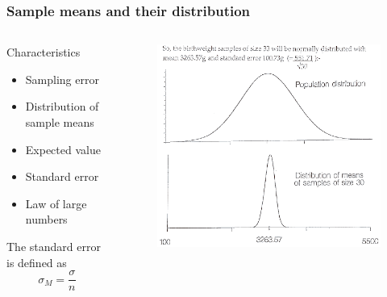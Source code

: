 \documentclass[10pt, compress]{beamer}
\begin{document}
\begin{frame}
    \frametitle{Sample means and their distribution}
    \begin{columns}
        \begin{block}{Characteristics}
            \begin{itemize}

                \item Sampling error
                \item Distribution of sample means
                \item Expected value
                \item Standard error
                \item Law of large numbers
            \end{itemize}
            The standard error is defined as
            \begin{equation}
                \sigma_M = \frac{\sigma}{n}
            \end{equation}
        \end{block}
        \begin{block}{}
            \begin{figure}
                \begin{center}
                    \includegraphics[scale=0.3]{img/14_diag_b.png}
                \end{center}
            \end{figure}
        \end{block}
    \end{columns}
\end{frame}
\end{document}
